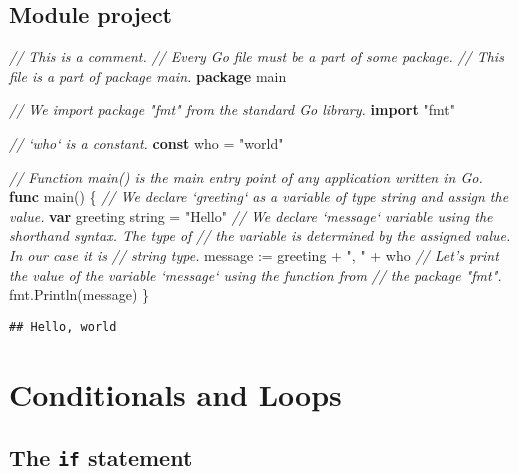 \documentclass[]{book}
\newenvironment{Shaded}{\begin{snugshade}}{\end{snugshade}}
\newcommand{\CommentTok}[1]{\textcolor[rgb]{0.56,0.35,0.01}{\textit{#1}}}
\newcommand{\DataTypeTok}[1]{\textcolor[rgb]{0.13,0.29,0.53}{#1}}
\newcommand{\KeywordTok}[1]{\textcolor[rgb]{0.13,0.29,0.53}{\textbf{#1}}}
\newcommand{\NormalTok}[1]{#1}
\newcommand{\StringTok}[1]{\textcolor[rgb]{0.31,0.60,0.02}{#1}}
\begin{document}
\hypertarget{module-project}{%
\section*{Module project}\label{module-project}}

\begin{Shaded}
\begin{Highlighting}[]
\CommentTok{// This is a comment.}
\CommentTok{// Every Go file must be a part of some package.}
\CommentTok{// This file is a part of package main.}
\KeywordTok{package}\NormalTok{ main}

\CommentTok{// We import package "fmt" from the standard Go library.}
\KeywordTok{import} \StringTok{"fmt"}

\CommentTok{// `who` is a constant.}
\KeywordTok{const}\NormalTok{ who = }\StringTok{"world"}

\CommentTok{// Function main() is the main entry point of any application written in Go.}
\KeywordTok{func}\NormalTok{ main() \{}
    \CommentTok{// We declare `greeting` as a variable of type string and assign the value.}
    \KeywordTok{var}\NormalTok{ greeting }\DataTypeTok{string}\NormalTok{ = }\StringTok{"Hello"}
    \CommentTok{// We declare `message` variable using the shorthand syntax. The type of}
    \CommentTok{// the variable is determined by the assigned value. In our case it is}
    \CommentTok{// string type.}
\NormalTok{    message := greeting + }\StringTok{", "}\NormalTok{ + who}
    \CommentTok{// Let's print the value of the variable `message` using the function from}
    \CommentTok{// the package "fmt".}
\NormalTok{    fmt.Println(message)}
\NormalTok{\}}
\end{Highlighting}
\end{Shaded}

\begin{verbatim}
## Hello, world
\end{verbatim}

\hypertarget{conditionals-and-loops}{%
\chapter{Conditionals and Loops}\label{conditionals-and-loops}}

\hypertarget{the-if-statement}{%
\section{\texorpdfstring{The \texttt{if} statement}{The if statement}}\label{the-if-statement}}
\end{document}
